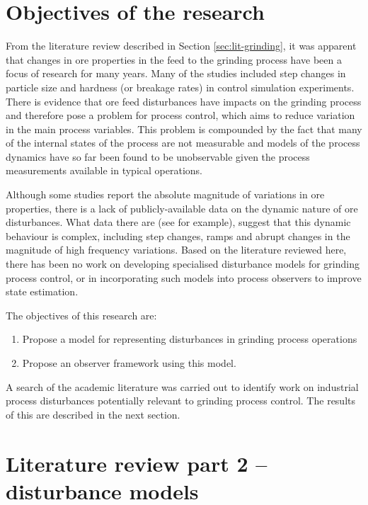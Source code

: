 \section{Objectives of the research} \label{sec:objectives}

From the literature review described in Section \ref{sec:lit-grinding}, it was apparent that changes in ore properties in the feed to the grinding process have been a focus of research for many years. Many of the studies included step changes in particle size and hardness (or breakage rates) in control simulation experiments. There is evidence that ore feed disturbances have  impacts on the grinding process and therefore pose a problem for process control, which aims to reduce variation in the main process variables. This problem is compounded by the fact that many of the internal states of the process are not measurable and models of the process dynamics have so far been found to be unobservable given the process measurements available in typical operations. 

Although some studies report the absolute magnitude of variations in ore properties, there is a lack of publicly-available data on the dynamic nature of ore disturbances. What data there are (see \cite{steyn_investigating_2018} for example), suggest that this dynamic behaviour is complex, including step changes, ramps and abrupt changes in the magnitude of high frequency variations. Based on the literature reviewed here, there has been no work on developing specialised disturbance models for grinding process control, or in incorporating such models into process observers to improve state estimation.

The objectives of this research are:
\begin{enumerate}
	\item Propose a model for representing disturbances in grinding process operations
	\item Propose an observer framework using this model.
\end{enumerate}
A search of the academic literature was carried out to identify work on industrial process disturbances potentially relevant to grinding process control. The results of this are described in the next section.


\section{Literature review part 2 – disturbance models} \label{sec:lit-disturb-models}

